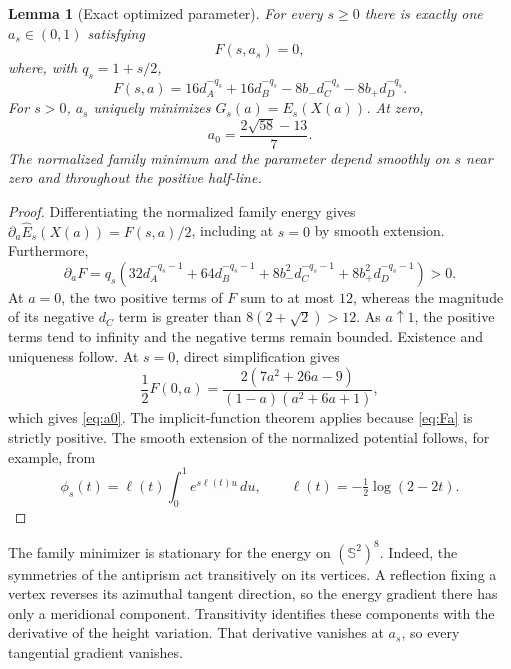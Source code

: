 \documentclass[12pt,reqno]{amsart}
\newtheorem{lemma}[theorem]{Lemma}
\theoremstyle{definition}
\newcommand{\Sph}{\mathbb S^2}
\newcommand{\Eh}{\widehat E}
\numberwithin{equation}{section}
\begin{document}
\begin{lemma}[Exact optimized parameter]\label{lem:parameter}
For every $s\ge0$ there is exactly one $a_s\in(0,1)$ satisfying
\begin{equation}\label{eq:root}
 F(s,a_s)=0,
\end{equation}
where, with $q_s=1+s/2$,
\begin{equation}\label{eq:F}
 F(s,a)=16d_A^{-q_s}+16d_B^{-q_s}
        -8b_-d_C^{-q_s}-8b_+d_D^{-q_s}.
\end{equation}
For $s>0$, $a_s$ uniquely minimizes $G_s(a)=E_s(X(a))$. At zero,
\begin{equation}\label{eq:a0}
 a_0=\frac{2\sqrt{58}-13}{7}.
\end{equation}
The normalized family minimum and the parameter depend smoothly on $s$
near zero and throughout the positive half-line.
\end{lemma}
\begin{proof}
Differentiating the normalized family energy gives
$\partial_a\Eh_s(X(a))=F(s,a)/2$, including at $s=0$ by smooth extension.
Furthermore,
\begin{equation}\label{eq:Fa}
 \partial_aF=q_s\left(32d_A^{-q_s-1}+64d_B^{-q_s-1}
             +8b_-^2d_C^{-q_s-1}+8b_+^2d_D^{-q_s-1}\right)>0.
\end{equation}
At $a=0$, the two positive terms of $F$ sum to at most $12$, whereas
the magnitude of its negative $d_C$ term is greater than
$8(2+\sqrt2)>12$. As $a\uparrow1$, the positive terms tend to infinity
and the negative terms remain bounded. Existence and uniqueness follow.
At $s=0$, direct simplification gives
\[
 \frac12F(0,a)=\frac{2(7a^2+26a-9)}{(1-a)(a^2+6a+1)},
\]
which gives \eqref{eq:a0}. The implicit-function theorem applies because
\eqref{eq:Fa} is strictly positive. The smooth extension of the normalized
potential follows, for example, from
\[
 \phi_s(t)=\ell(t)\int_0^1 e^{s\ell(t)u}\,du,
 \qquad \ell(t)=-\tfrac12\log(2-2t).
\]
\end{proof}





The family minimizer is stationary for the energy on $(\Sph)^8$.
Indeed, the symmetries of the antiprism act transitively on its vertices.
A reflection fixing a vertex reverses its azimuthal tangent direction,
so the energy gradient there has only a meridional component.
Transitivity identifies these components with the derivative of the
height variation. That derivative vanishes at $a_s$, so every tangential
gradient vanishes.
\end{document}
